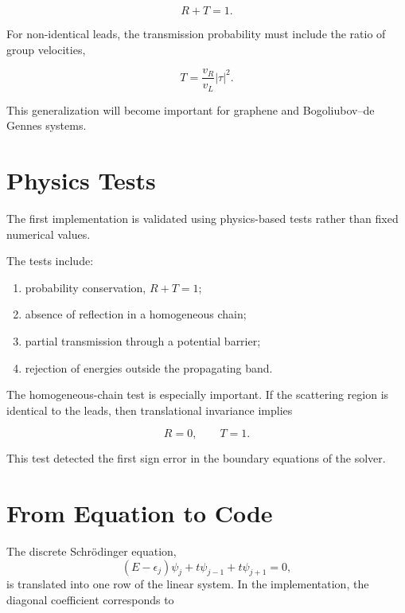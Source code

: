 \begin{equation}
	R+T=1.
	\label{eq:probability-conservation}
\end{equation}

For non-identical leads, the transmission probability must include the
ratio of group velocities,

\begin{equation}
	T
	=
	\frac{v_R}{v_L}
	|\tau|^2.
\end{equation}

This generalization will become important for graphene and
Bogoliubov--de Gennes systems.

\section{Physics Tests}

The first implementation is validated using physics-based tests rather
than fixed numerical values.

The tests include:
\begin{enumerate}
	\item probability conservation, $R+T=1$;
	\item absence of reflection in a homogeneous chain;
	\item partial transmission through a potential barrier;
	\item rejection of energies outside the propagating band.
\end{enumerate}

The homogeneous-chain test is especially important. If the scattering
region is identical to the leads, then translational invariance implies

\begin{equation}
	R=0,
	\qquad
	T=1.
\end{equation}

This test detected the first sign error in the boundary equations of the
solver.

\section{From Equation to Code}

The discrete Schrödinger equation,
\begin{equation}
	(E-\epsilon_j)\psi_j
	+
	t\psi_{j-1}
	+
	t\psi_{j+1}
	=
	0,
\end{equation}
is translated into one row of the linear system. In the implementation,
the diagonal coefficient corresponds to

